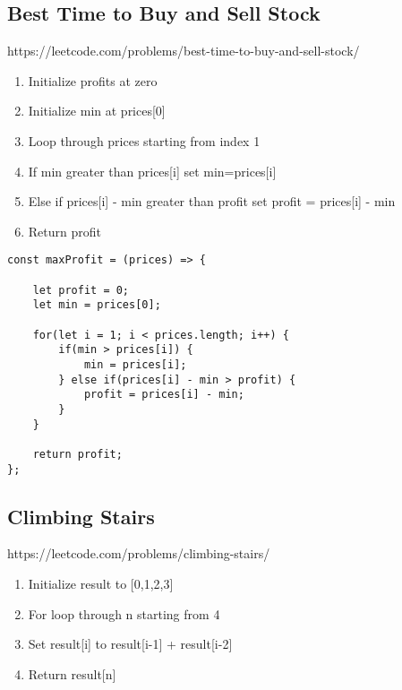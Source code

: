 \documentclass[10pt]{article}
\begin{document}
\medskip %







\pagebreak %
\medskip   
\subsection{Best Time to Buy and Sell Stock}
https://leetcode.com/problems/best-time-to-buy-and-sell-stock/

\begin{enumerate}
	\item Initialize profits at zero
	\item Initialize min at prices[0]
	\item Loop through prices starting from index 1 
	\item If min greater than prices[i] set min=prices[i]
	\item Else if prices[i] - min greater than profit set profit = prices[i] - min
	\item Return profit
\end{enumerate}

\begin{lstlisting}[title=Solution maxProfit, captionpos=t]
const maxProfit = (prices) => {
    
    let profit = 0;
    let min = prices[0];
    
    for(let i = 1; i < prices.length; i++) { 
        if(min > prices[i]) {
            min = prices[i];
        } else if(prices[i] - min > profit) {
            profit = prices[i] - min;
        }
    }
    
    return profit;
};
\end{lstlisting}

\medskip %









\pagebreak %
\medskip   
\subsection{Climbing Stairs}
https://leetcode.com/problems/climbing-stairs/

\begin{enumerate}
	\item Initialize result to [0,1,2,3]
	\item For loop through n starting from 4
	\item Set result[i] to result[i-1] + result[i-2]
	\item Return result[n]
\end{enumerate}
\end{document}

